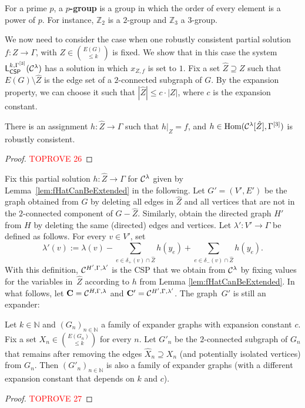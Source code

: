 \documentclass[a4paper,english, thm-restate]{lipics-v2021}
\newcommand{\defining}[1]{\textbf{#1}}
\newcommand{\StructC}{\mathbf{C}}
\newcommand{\Hom}[2]{\mathrm{Hom}(#1,#2)}
\newcommand{\leqs}{\mathsf{L}}
\newcommand{\cspiso}[3]{\leqs^{#1,#2}_{\mathsf{CSP}}(#3)}
\newcommand{\bbN}{\mathbb{N}}
\newcommand{\bbZ}{\mathbb{Z}}
\newcommand{\CosetGrpTmplt}[2]{#1^{[#2]}}
\begin{document}
	
	
	\noindent For a prime $p$, a \defining{$p$-group} is a group in which the order of every element is a power of $p$. For instance, $\bbZ_2$ is a $2$-group and $\bbZ_3$ a $3$-group.
	
	
	
	
	\noindent We now need to consider the case when one robustly consistent partial solution $f: Z \to \Gamma$, with $Z \in \binom{E(G)}{\leq k}$ is fixed.
	We show that in this case
	the system $\cspiso{k}{\CosetGrpTmplt{\Gamma}{3}}{\grpCSPf{H}{\Gamma}{\lambda}}$ has a solution in which $x_{Z,f}$ is set to $1$.
	Fix a set $\hat{Z} \supseteq Z$ such that $E(G) \setminus \hat{Z}$ is the edge set of a $2$-connected subgraph of $G$.
	By the expansion property, we can choose it such that $|\hat{Z}| \leq c \cdot |Z|$, where $c$ is the expansion constant. 
	\begin{lemma}
		\label{lem:fHatCanBeExtended}
		There is an assignment $h : \hat{Z} \to \Gamma$ such that $h|_{Z} = f$, and $h \in \Hom{\grpCSPf{H}{\Gamma}{\lambda}[\hat{Z}]}{\CosetGrpTmplt{\Gamma}{3}}$ is robustly consistent.
	\end{lemma}	
	\begin{proof}\textcolor{red}{TOPROVE 26}\end{proof}	
	\noindent Fix this partial solution $h \colon \hat{Z} \to \Gamma$ 
	for $\grpCSPf{H}{\Gamma}{\lambda}$ given by Lemma~\ref{lem:fHatCanBeExtended} in the following.
	Let $G'=(V',E')$ be the graph obtained from $G$ by deleting all edges in $\hat{Z}$
	and all vertices that are not in the $2$\nobreakdash-connected component of $G-\hat{Z}$.
	Similarly, obtain the directed graph $H'$ from $H$ by deleting the same (directed) edges and vertices.
	Let $\lambda' : V' \to \Gamma$ be defined as follows. For every $v \in V'$, set
	\[
	\lambda'(v) := \lambda(v) - \sum_{e \in \delta_+(v) \cap \hat{Z}} h(y_e) + \sum_{e \in \delta_-(v) \cap \hat{Z}} h(y_e) .
	\] 
	With this definition, $\grpCSP{H'}{\Gamma}{\lambda'}$ is the CSP that we obtain from $\grpCSPf{H}{\Gamma}{\lambda}$ by fixing values for the variables in~$\hat{Z}$ according to $h$ from Lemma \ref{lem:fHatCanBeExtended}. In what follows, let $\StructC = \grpCSP{H}{\Gamma}{\lambda}$
	and $\StructC' = \grpCSP{H'}{\Gamma}{\lambda'}$.
	The graph~$G'$ is still an expander:
	\begin{lemma}
		\label{lem:expandersRobust}
		Let $k \in \bbN$ and $(G_n)_{n \in \bbN}$ a family of expander graphs with expansion constant $c$. Fix a set $X_n \in \binom{E(G_n)}{\leq k}$ for every $n$.
		Let $G'_n$ be the $2$-connected subgraph of $G_n$ that remains after removing the edges $\hat{X}_n \supseteq X_n$ (and potentially isolated vertices) from $G_n$. Then $(G'_n)_{n \in \bbN}$ is also a family of expander graphs (with a different expansion constant that depends on $k$ and $c$).
	\end{lemma}	
	\begin{proof}\textcolor{red}{TOPROVE 27}\end{proof}	
	
\end{document}

